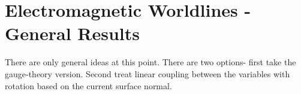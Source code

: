 \chapter{Electromagnetic Worldlines - General Results}
\label{ch:general}
There are only general ideas at this point.
There are two options- first take the gauge-theory version.
Second treat linear coupling between the variables with rotation based on the current surface normal.




